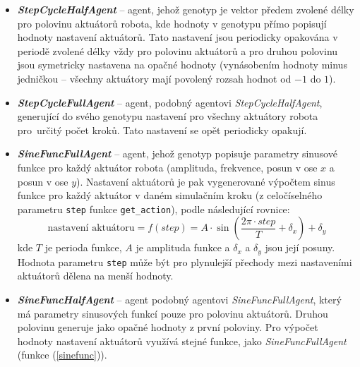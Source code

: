 \label{imp:gaAgents.stepcyclehalfagent}
\label{imp:gaAgents.sinefuncfullagent}
\label{imp:gaAgents.sinefunchalfagent}
\label{imp:gaAgents.stepcyclehalfagent}
\label{imp:gaAgents.TFSagent}
\begin{itemize}
    \item \textbf{\emph{StepCycleHalfAgent}} -- agent, jehož genotyp je vektor
        předem zvolené délky pro polovinu aktuátorů robota, kde hodnoty v
        genotypu přímo popisují hodnoty nastavení aktuátorů. Tato nastavení
        jsou periodicky opakována v periodě zvolené délky vždy pro polovinu
        aktuátorů a pro druhou polovinu jsou symetricky nastavena na opačné
        hodnoty (vynásobením hodnoty minus jedničkou -- všechny aktuátory mají
        povolený rozsah hodnot od $-1$ do $1$).

    \item \textbf{\emph{StepCycleFullAgent}} -- agent, podobný agentovi
        \emph{StepCycleHalfAgent}, generující do svého genotypu nastavení pro
        všechny aktuátory robota pro~určitý počet kroků. Tato nastavení se opět
        periodicky opakují.

    \item \textbf{\emph{SineFuncFullAgent}} -- agent, jehož genotyp popisuje
        parametry sinusové funkce pro každý aktuátor robota (amplituda,
        frekvence, posun v ose $x$ a posun v ose $y$). Nastavení aktuátorů je
        pak vygenerované výpočtem sinus funkce pro každý aktuátor v daném
        simulačním kroku (z celočíselného parametru \texttt{step} funkce
        \texttt{get\_action}), podle následující rovnice:
        \begin{equation}
            \text{nastavení aktuátoru} = f(step) = A\cdot\sin(\frac{2\pi\cdot step}{T} + \delta_x) + \delta_y
            \label{sinefunc}
        \end{equation}
        kde $T$ je perioda funkce, $A$ je amplituda funkce a $\delta_x$ a
        $\delta_y$ jsou její posuny. Hodnota parametru \texttt{step} může být
        pro plynulejší přechody mezi nastaveními aktuátorů dělena na menší
        hodnoty.

    \item \textbf{\emph{SineFuncHalfAgent}} -- agent podobný agentovi
        \emph{SineFuncFullAgent}, který má parametry sinusových funkcí pouze
        pro polovinu aktuátorů. Druhou polovinu generuje jako opačné hodnoty z
        první poloviny. Pro výpočet hodnoty nastavení aktuátorů využívá stejné
        funkce, jako \emph{SineFuncFullAgent} (funkce (\ref{sinefunc})).


\end{itemize}
